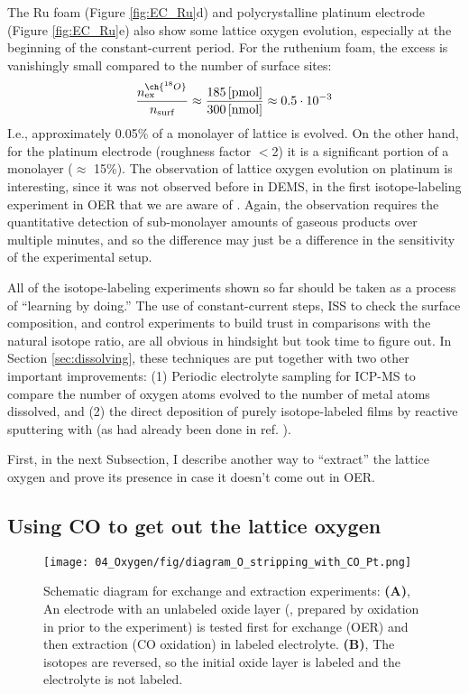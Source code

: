 The Ru foam (Figure \ref{fig:EC_Ru}d) and polycrystalline platinum electrode (Figure \ref{fig:EC_Ru}e) also show some lattice oxygen evolution, especially at the beginning of the constant-current period. For the ruthenium foam, the excess  is vanishingly small compared to the number of surface sites:
\begin{equation}
\frac{n^{\ch{^{18}O}}_{\text{ex}}}{n_{\text{surf}}}\approx\frac{185\,\text{[pmol]}}{300\,\text{[nmol]}}\approx 0.5 \cdot 10^{-3}
\end{equation}
I.e., approximately 0.05\% of a monolayer of lattice  is evolved. On the other hand, for the platinum electrode (roughness factor $<$2) it is a significant portion of a monolayer ($\approx$ 15\%). The observation of lattice oxygen evolution on platinum is interesting, since it was not observed before in DEMS, in the first isotope-labeling experiment in OER that we are aware of \cite{Willsau1985}. Again, the observation requires the quantitative detection of sub-monolayer amounts of gaseous products over multiple minutes, and so the difference may just be a difference in the sensitivity of the experimental setup.

All of the isotope-labeling experiments shown so far should be taken as a process of ``learning by doing.'' The use of constant-current steps, ISS to check the surface composition, and control experiments to build trust in comparisons with the natural isotope ratio, are all obvious in hindsight but took time to figure out. In Section \ref{sec:dissolving}, these techniques are put together with two other important improvements: (1) Periodic electrolyte sampling for ICP-MS to compare the number of oxygen atoms evolved to the number of metal atoms dissolved, and (2) the direct deposition of purely isotope-labeled films by reactive sputtering with  (as had already been done in ref. ). 

First, in the next Subsection, I describe another way to ``extract'' the lattice oxygen and prove its presence in case it doesn't come out in OER.


\subsection{Using CO to get out the lattice oxygen} \label{subsec:extraction}

\begin{figure}[b!]
	\centering
	\texttt{[image: 04\_Oxygen/fig/diagram\_O\_stripping\_with\_CO\_Pt.png]}
	\caption{
		Schematic diagram for exchange and extraction experiments: \textbf{(A)}, An electrode with an unlabeled oxide layer (, prepared by oxidation in  prior to the experiment) is tested first for exchange (OER) and then extraction (CO oxidation) in labeled electrolyte. \textbf{(B)}, The isotopes are reversed, so the initial oxide layer is labeled and the electrolyte is not labeled.
	}
	\label{fig:Pt_extraction_diagram}
\end{figure}


